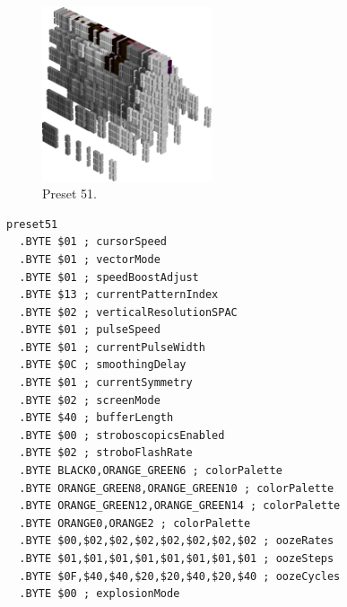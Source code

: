 \clearpage
\begin{minipage}[b]{0.48\linewidth}
\begin{figure}[H]                                                          
  \centering                                                             
  \begin{adjustbox}{width=5cm,center}                                   
  \includegraphics[width=5cm]{src/colorspace_presets/preset51-45.png}%
  \end{adjustbox}                                                        
\caption*{Preset 51.}                                           
\end{figure}                                                               
\end{minipage}
\hspace{0.1cm}
\begin{minipage}[b]{0.48\linewidth}                            
\begin{lstlisting}[basicstyle=\ttfamily\tiny]
preset51
  .BYTE $01 ; cursorSpeed
  .BYTE $01 ; vectorMode
  .BYTE $01 ; speedBoostAdjust
  .BYTE $13 ; currentPatternIndex
  .BYTE $02 ; verticalResolutionSPAC
  .BYTE $01 ; pulseSpeed
  .BYTE $01 ; currentPulseWidth
  .BYTE $0C ; smoothingDelay
  .BYTE $01 ; currentSymmetry
  .BYTE $02 ; screenMode
  .BYTE $40 ; bufferLength
  .BYTE $00 ; stroboscopicsEnabled
  .BYTE $02 ; stroboFlashRate
  .BYTE BLACK0,ORANGE_GREEN6 ; colorPalette
  .BYTE ORANGE_GREEN8,ORANGE_GREEN10 ; colorPalette
  .BYTE ORANGE_GREEN12,ORANGE_GREEN14 ; colorPalette
  .BYTE ORANGE0,ORANGE2 ; colorPalette
  .BYTE $00,$02,$02,$02,$02,$02,$02,$02 ; oozeRates
  .BYTE $01,$01,$01,$01,$01,$01,$01,$01 ; oozeSteps
  .BYTE $0F,$40,$40,$20,$20,$40,$20,$40 ; oozeCycles
  .BYTE $00 ; explosionMode
\end{lstlisting}
\end{minipage}

\vspace*{-0.5cm}

